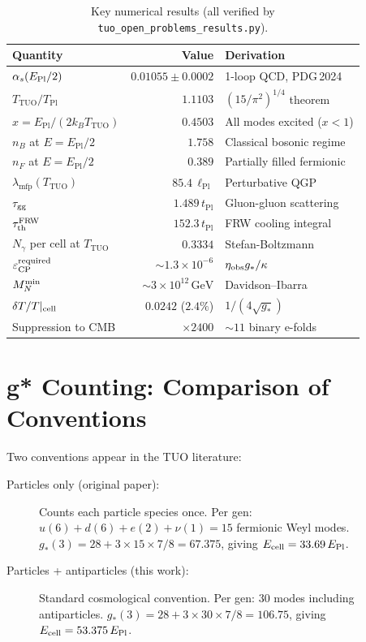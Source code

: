\documentclass[12pt,a4paper]{article}
\theoremstyle{definition}
\newcommand{\tPl}{t_{\mathrm{Pl}}}
\newcommand{\lPl}{\ell_{\mathrm{Pl}}}
\newcommand{\TPl}{T_{\mathrm{Pl}}}
\newcommand{\EPl}{E_{\mathrm{Pl}}}
\newcommand{\TTUO}{T_{\mathrm{TUO}}}
\newcommand{\gstar}{g_{*}}
\newcommand{\Hmfp}{\lambda_{\mathrm{mfp}}}
\newcommand{\alphas}{\alpha_{s}}
\newcommand{\eps}{\varepsilon}
\begin{document}
\begin{table}[h]
\centering
\caption{Key numerical results (all verified by \texttt{tuo\_open\_problems\_results.py}).}
\label{tab:numbers}
\begin{tabular}{lrl}
\toprule
Quantity & Value & Derivation \\
\midrule
$\alphas(E_{\rm Pl}/2)$ & $0.01055 \pm 0.0002$ & 1-loop QCD, PDG\,2024 \\
$\TTUO / \TPl$ & $1.1103$ & $(15/\pi^2)^{1/4}$ theorem \\
$x = \EPl/(2k_B\TTUO)$ & $0.4503$ & All modes excited ($x < 1$) \\
$n_B$ at $E = \EPl/2$ & $1.758$ & Classical bosonic regime \\
$n_F$ at $E = \EPl/2$ & $0.389$ & Partially filled fermionic \\
$\Hmfp(\TTUO)$ & $85.4\,\lPl$ & Perturbative QGP \\
$\tau_{\rm gg}$ & $1.489\,\tPl$ & Gluon-gluon scattering \\
$\tau_{\rm th}^{\rm FRW}$ & $152.3\,\tPl$ & FRW cooling integral \\
$N_\gamma$ per cell at $\TTUO$ & $0.3334$ & Stefan-Boltzmann \\
$\eps_{\rm CP}^{\rm required}$ & $\sim 1.3\times10^{-6}$ & $\eta_{\rm obs}\gstar/\kappa$ \\
$M_N^{\rm min}$ & $\sim 3\times10^{12}\,\mathrm{GeV}$ & Davidson--Ibarra \\
$\delta T/T|_{\rm cell}$ & $0.0242$ ($2.4\%$) & $1/(4\sqrt{\gstar})$ \\
Suppression to CMB & $\times 2400$ & $\sim 11$ binary e-folds \\
\bottomrule
\end{tabular}
\end{table}

\section{g* Counting: Comparison of Conventions}

Two conventions appear in the TUO literature:

\begin{description}
\item[Particles only (original paper):] Counts each particle species once.
  Per gen: $u(6) + d(6) + e(2) + \nu(1) = 15$ fermionic Weyl modes.
  $\gstar(3) = 28 + 3\times15\times7/8 = 67.375$, giving $E_{\rm cell} = 33.69\,\EPl$.

\item[Particles + antiparticles (this work):] Standard cosmological convention.
  Per gen: $30$ modes including antiparticles.
  $\gstar(3) = 28 + 3\times30\times7/8 = 106.75$, giving $E_{\rm cell} = 53.375\,\EPl$.
\end{description}
\end{document}
